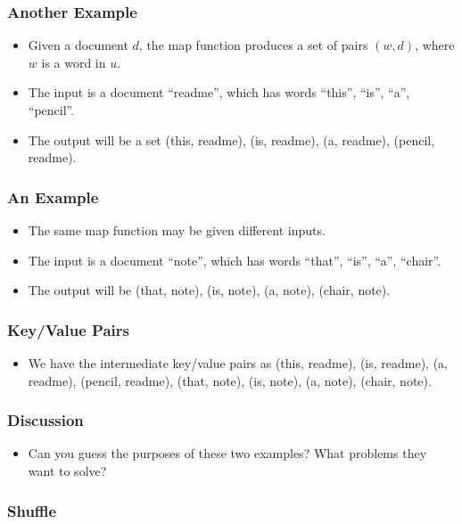 \documentclass{beamer}
\begin{document}
\begin{frame}
  \frametitle{Another Example}
  \begin{itemize}
    \item Given a document $d$, the map function produces a set of
      pairs $(w, d)$, where $w$ is a word in $u$.
    \item The input is a document ``readme'', which has words
      ``this'', ``is'', ``a'', ``pencil''.
    \item The output will be a set (this, readme), (is, readme), (a,
      readme), (pencil, readme).
  \end{itemize}
\end{frame}

\begin{frame}
  \frametitle{An Example} 
  \begin{itemize}
    \item The same map function may be given different inputs.
    \item The input is a document ``note'', which has words ``that'',
      ``is'', ``a'', ``chair''.
    \item The output will be (that, note), (is, note), (a,
      note), (chair, note).
  \end{itemize}
\end{frame}

\begin{frame}
  \frametitle{Key/Value Pairs}
  \begin{itemize}
    \item We have the intermediate key/value pairs as (this,
      readme), (is, readme), (a, readme), (pencil, readme), (that,
      note), (is, note), (a, note), (chair, note).
  \end{itemize}
\end{frame}

\begin{frame}
  \frametitle{Discussion}
  \begin{itemize}
    \item Can you guess the purposes of these two examples?  What
      problems they want to solve?
  \end{itemize}
\end{frame}

\subsubsection{Shuffle}
\end{document}
